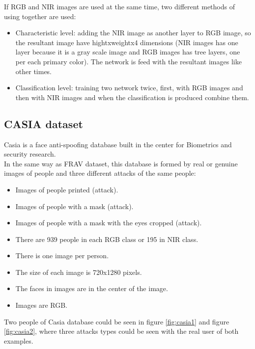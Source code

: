 If RGB and NIR images are used at the same time, two different methods of using together are used:
\begin{itemize}
\item Characteristic level: adding the NIR image as another layer to RGB image, so the resultant image have hightxweightx4 dimensions (NIR images has one layer because it is a gray scale image and RGB images has tree layers, one per each primary color). The network is feed with the resultant images like other times.
\item Classification level: training two network twice, first, with RGB images and then with NIR images and when the classification is produced combine them.
\end{itemize}

\subsection{CASIA dataset}
Casia is a face anti-spoofing database built in the center for Biometrics and security research.\\

In the same way as FRAV dataset, this database is formed by real or genuine images of people and three different attacks of the same people:

\begin{itemize}
 \item Images of people printed (attack).
 \item Images of people with a mask (attack).
 \item Images of people with a mask with the eyes cropped (attack).
 \end{itemize}


\begin{itemize}
\item There are 939 people in each RGB class or 195 in NIR class.
\item There is one image per person.
\item The size of each image is 720x1280 pixels.
\item The faces in images are in the center of the image.\\
\item Images are RGB.
\end{itemize}


Two people of Casia database could be seen in figure \ref{fig:casia1} and figure \ref{fig:casia2}, where three attacks types could be seen with the real user of both examples.

